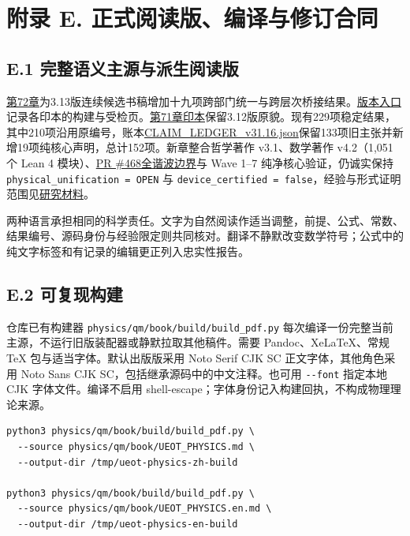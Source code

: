 \documentclass[
  11pt,
  oneside]{book}
\begin{document}
\chapter{附录 E. 正式阅读版、编译与修订合同}\label{appendix-e}\hypertarget{appendix-e}{}

\section{E.1 完整语义主源与派生阅读版}

\protect\hyperlink{ch-72}{第72章}为3.13版连续候选书稿增加十九项跨部门统一与跨层次桥接结果。\href{README.md}{版本入口}记录各印本的构建与受检页。\href{https://github.com/MurphyHoops/UEOT/blob/cc5670d5f2ac96f8\allowbreak 8270c0f38ae6fb6f\allowbreak 77e26093/physics/qm/book/UEOT_PHYSICS.pdf}{第71章印本}保留3.12版原貌。现有229项稳定结果，其中210项沿用原编号，账本\href{../status/CLAIM_LEDGER_v31.16.json}{CLAIM\_\allowbreak LEDGER\_\allowbreak v31.16.json}保留133项旧主张并新增19项纯核心声明，总计152项。新章整合哲学著作
v3.1、数学著作 v4.2（1,051个 Lean 4
模块）、\href{../null_source/timelike/finite_stress/lapse_boundary/all_harmonic_horizon/README.md}{PR
\#468全谐波边界}与 Wave 1--7 纯净核心验证，仍诚实保持
\texttt{physical\_\allowbreak unification\ =\ OPEN} 与
\texttt{device\_\allowbreak certified\ =\ false}，经验与形式证明范围见\href{../../unification/README.md}{研究材料}。

两种语言承担相同的科学责任。文字为自然阅读作适当调整，前提、公式、常数、结果编号、源码身份与经验限定则共同核对。翻译不静默改变数学符号；公式中的纯文字标签和有记录的编辑更正列入忠实性报告。

\section{E.2 可复现构建}

仓库已有构建器 \texttt{physics/\allowbreak qm/\allowbreak book/\allowbreak build/\allowbreak build\_\allowbreak pdf.\allowbreak py}
每次编译一份完整当前主源，不运行旧版装配器或静默拉取其他稿件。需要
Pandoc、XeLaTeX、常规 TeX 包与适当字体。默认出版版采用 Noto Serif CJK SC
正文字体，其他角色采用 Noto Sans CJK
SC，包括继承源码中的中文注释。也可用 \texttt{-\allowbreak \/\allowbreak -\allowbreak font} 指定本地 CJK
字体文件。编译不启用
shell-escape；字体身份记入构建回执，不构成物理理论来源。

\begin{Verbatim}[breaklines,breakanywhere,fontsize=\scriptsize]
python3 physics/qm/book/build/build_pdf.py \
  --source physics/qm/book/UEOT_PHYSICS.md \
  --output-dir /tmp/ueot-physics-zh-build

python3 physics/qm/book/build/build_pdf.py \
  --source physics/qm/book/UEOT_PHYSICS.en.md \
  --output-dir /tmp/ueot-physics-en-build
\end{Verbatim}
\end{document}
